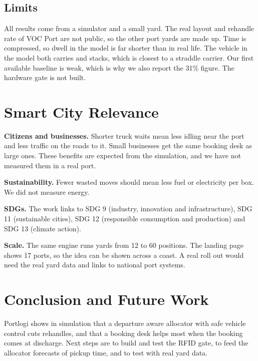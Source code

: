 \documentclass[conference]{IEEEtran}
\begin{document}
\subsection{Limits}
All results come from a simulator and a small yard. The real layout and rehandle rate of VOC Port are not public, so the other port yards are made up. Time is compressed, so dwell in the model is far shorter than in real life. The vehicle in the model both carries and stacks, which is closest to a straddle carrier. Our first available baseline is weak, which is why we also report the 31\% figure. The hardware gate is not built.

\section{Smart City Relevance}
\textbf{Citizens and businesses.} Shorter truck waits mean less idling near the port and less traffic on the roads to it. Small businesses get the same booking desk as large ones. These benefits are expected from the simulation, and we have not measured them in a real port.

\textbf{Sustainability.} Fewer wasted moves should mean less fuel or electricity per box. We did not measure energy.

\textbf{SDGs.} The work links to SDG 9 (industry, innovation and infrastructure), SDG 11 (sustainable cities), SDG 12 (responsible consumption and production) and SDG 13 (climate action).

\textbf{Scale.} The same engine runs yards from 12 to 60 positions. The landing page shows 17 ports, so the idea can be shown across a coast. A real roll out would need the real yard data and links to national port systems.

\section{Conclusion and Future Work}
Portlogi shows in simulation that a departure aware allocator with safe vehicle control cuts rehandles, and that a booking desk helps most when the booking comes at discharge. Next steps are to build and test the RFID gate, to feed the allocator forecasts of pickup time, and to test with real yard data.
\end{document}
